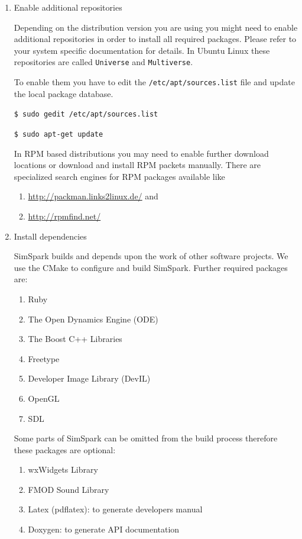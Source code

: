 \begin{enumerate}

\item Enable additional repositories

Depending on the distribution version you are using you might need to
enable additional repositories in order to install all required
packages. Please refer to your system specific documentation for
details. In Ubuntu Linux these repositories are called
\texttt{Universe} and \texttt{Multiverse}.

To enable them you have to edit the \texttt{/etc/apt/sources.list}
file and update the local package database.

\texttt{\$ sudo gedit /etc/apt/sources.list}


\texttt{\$ sudo apt-get update}


In RPM based distributions you may need to enable further download
locations or download and install RPM packets manually. There are
specialized search engines for RPM packages available like 

\begin{enumerate}
\item\url{http://packman.links2linux.de/} and
\item\url{http://rpmfind.net/}
\end{enumerate}

\item Install dependencies

SimSpark builds and depends upon the work of other software
projects. We use the CMake to configure and build
SimSpark.
Further required packages are:

\begin{enumerate}
\item Ruby
\item The Open Dynamics Engine (ODE)
\item The Boost C++ Libraries
\item Freetype
\item Developer Image Library (DevIL)
\item OpenGL
\item SDL
\end{enumerate}

Some parts of SimSpark can be omitted from the build process
therefore these packages are optional:

\begin{enumerate}
\item wxWidgets Library
\item FMOD Sound Library
\item Latex (pdflatex): to generate developers manual
\item Doxygen: to generate API documentation
\end{enumerate}


\end{enumerate}

